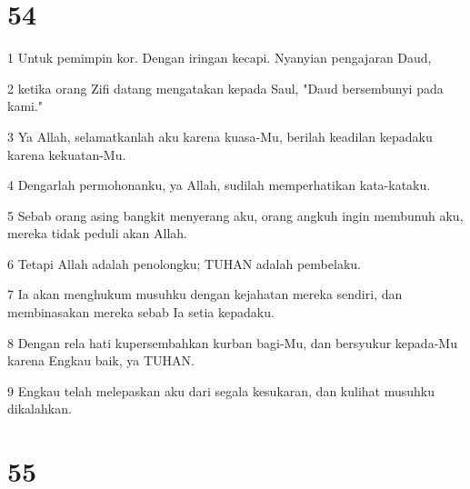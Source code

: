 \chapter{54}

\par 1 Untuk pemimpin kor. Dengan iringan kecapi. Nyanyian pengajaran Daud,
\par 2 ketika orang Zifi datang mengatakan kepada Saul, "Daud bersembunyi pada kami."
\par 3 Ya Allah, selamatkanlah aku karena kuasa-Mu, berilah keadilan kepadaku karena kekuatan-Mu.
\par 4 Dengarlah permohonanku, ya Allah, sudilah memperhatikan kata-kataku.
\par 5 Sebab orang asing bangkit menyerang aku, orang angkuh ingin membunuh aku, mereka tidak peduli akan Allah.
\par 6 Tetapi Allah adalah penolongku; TUHAN adalah pembelaku.
\par 7 Ia akan menghukum musuhku dengan kejahatan mereka sendiri, dan membinasakan mereka sebab Ia setia kepadaku.
\par 8 Dengan rela hati kupersembahkan kurban bagi-Mu, dan bersyukur kepada-Mu karena Engkau baik, ya TUHAN.
\par 9 Engkau telah melepaskan aku dari segala kesukaran, dan kulihat musuhku dikalahkan.

\chapter{55}

